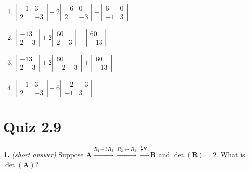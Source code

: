 \documentclass[10pt,a4paper]{article}
\begin{document}
\begin{enumerate}[label=(\Alph*)]
\item \(\left|\begin{array}{cc} -1 & 3 \\ 2 & -3  \end{array}\right|  + 2 \left|\begin{array}{cc} -6 & 0 \\ 2 & -3  \end{array}\right| + \left|\begin{array}{cc} 6 & 0 \\ -1 & 3  \end{array}\right|\)
\item \(\left|\begin{array}{cc}-1 3 \\2 -3\end{array}\right|+ 2 \left|\begin{array}{cc}6 0 \\2 -3\end{array}\right|+ \left|\begin{array}{cc}6 0 \\-1 3\end{array}\right|\)
\item \(\left|\begin{array}{cc} -1 3 \\ 2 -3 \end{array}\right| + 2 \left|\begin{array}{cc} 6 0 \\ -2 -3 \end{array}\right| + \left|\begin{array}{cc} 6 0 \\ -1 3 \end{array}\right|\)
\item \(\left|\begin{array}{cc} -1 & 3 \\ 2 & -3  \end{array}\right| + 6 \left|\begin{array}{cc} -2 & -3 \\ -1 & 3  \end{array}\right|\)
\end{enumerate}
\smallskip
\section{Quiz 2.9}
\textbf{1.} \textit{(short answer)} Suppose \(\mathbf{A}\xrightarrow{R_1+3R_3}\xrightarrow{R_2\leftrightarrow R_1}\xrightarrow{\frac{1}{3}R_3}\mathbf{R}\) and \(\det(\mathbf{R})=2\). What is \(\det(\mathbf{A})\)?
\end{document}
